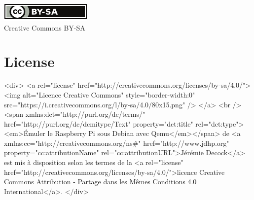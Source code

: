 \documentclass{article}
\begin{document}



\ifpdf
    \vfill %
    \begin{center}
        \href{http://creativecommons.org/licenses/by-sa/4.0/}{\includegraphics[width=.15\linewidth]{fig/cc_by_sa_small}}\\
        \small{Creative Commons BY-SA}
    \end{center}
\else
    \section*{License}\label{sec:license}

    \begin{rawhtml}

        <div>
            <a rel="license" href="http://creativecommons.org/licenses/by-sa/4.0/">
                <img alt="Licence Creative Commons" style="border-width:0" src="https://i.creativecommons.org/l/by-sa/4.0/80x15.png" />
            </a>
            <br />
            <span xmlns:dct="http://purl.org/dc/terms/" href="http://purl.org/dc/dcmitype/Text" property="dct:title" rel="dct:type"><em>Émuler le Raspberry Pi sous Debian avec Qemu</em></span> de <a xmlns:cc="http://creativecommons.org/ns#" href="http://www.jdhp.org" property="cc:attributionName" rel="cc:attributionURL">Jérémie Decock</a> est mis à disposition selon les termes de la <a rel="license" href="http://creativecommons.org/licenses/by-sa/4.0/">licence Creative Commons Attribution -  Partage dans les Mêmes Conditions 4.0 International</a>.
        </div>

    \end{rawhtml}
\fi
\end{document}
